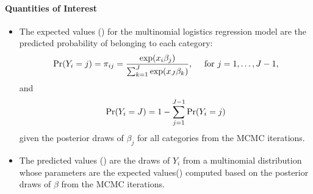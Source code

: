 \documentclass[letterpaper,10pt,english]{sphinxmanual}
\begin{document}
\paragraph{Quantities of Interest}
\label{zelig-mlogitbayes:quantities-of-interest}\begin{itemize}
\item {} 
The expected values () for the multinomial logistics
regression model are the predicted probability of belonging to each
category:
\begin{gather}
\begin{split}\begin{aligned}
\Pr(Y_i=j)=\pi_{ij}=\frac{\exp(x_i \beta_j)}{\sum_{k=1}^J \exp(x_J
\beta_k)}, \quad \textrm{ for } j=1,\ldots, J-1,\end{aligned}\end{split}\notag
\end{gather}
and
\begin{gather}
\begin{split}\begin{aligned}
\Pr(Y_i=J)=1-\sum_{j=1}^{J-1}\Pr(Y_i=j)\end{aligned}\end{split}\notag
\end{gather}
given the posterior draws of \(\beta_j\) for all categories from
the MCMC iterations.

\item {} 
The predicted values () are the draws of \(Y_i\) from a
multinomial distribution whose parameters are the expected
values() computed based on the posterior draws of
\(\beta\) from the MCMC iterations.


\end{itemize}
\end{document}

